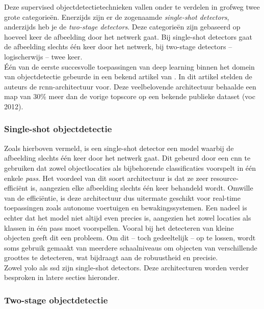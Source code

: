 Deze supervised objectdetectietechnieken vallen onder te verdelen in grofweg twee grote categorieën. Enerzijds zijn er de zogenaamde \emph{single-shot detectors}, anderzijds heb je de \emph{two-stage detectors}. Deze categorieën zijn gebaseerd op hoeveel keer de afbeelding door het netwerk gaat. Bij single-shot detectors gaat de afbeelding slechts één keer door het netwerk, bij two-stage detectors -- logischerwijs -- twee keer. \autocite{Carranza_Garcia_2020} \\

Één van de eerste succesvolle toepassingen van deep learning binnen het domein van objectdetectie gebeurde in een bekend artikel van \textcite{Girshick_2013}. In dit artikel stelden de auteurs de \gls{rcnn}-architectuur voor. Deze veelbelovende architectuur behaalde een \gls{map} van 30\% meer dan de vorige topscore op een bekende publieke dataset (\acrshort{voc} 2012).

\subsubsection{Single-shot objectdetectie}

Zoals hierboven vermeld, is een single-shot detector een model waarbij de afbeelding slechts één keer door het netwerk gaat. Dit gebeurd door een \gls{cnn} te gebruiken dat zowel objectlocaties als bijbehorende classificaties voorspelt in één enkele \emph{pass}. Het voordeel van dit soort architectuur is dat ze zeer resource-efficiënt is, aangezien elke afbeelding slechts één keer behandeld wordt. Omwille van de efficiëntie, is deze architectuur dus uitermate geschikt voor real-time toepassingen zoals autonome voertuigen en bewakingssystemen. Een nadeel is echter dat het model niet altijd even precies is, aangezien het zowel locaties als klassen in één pass moet voorspellen. Vooral bij het detecteren van kleine objecten geeft dit een probleem. Om dit -- toch gedeeltelijk -- op te lossen, wordt soms gebruik gemaakt van meerdere schaalniveaus om objecten van verschillende groottes te detecteren, wat bijdraagt aan de robuustheid en precisie. \autocite{Carranza_Garcia_2020} \\

Zowel \gls{yolo} als \gls{ssd} zijn single-shot detectors. Deze architecturen worden verder besproken in latere secties hieronder.

\subsubsection{Two-stage objectdetectie}

